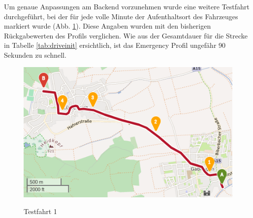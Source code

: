Um genaue Anpassungen am Backend vorzunehmen wurde eine weitere Testfahrt durchgeführt, bei der für jede volle Minute der Aufenthaltsort des Fahrzeuges markiert wurde (Abb. \ref{fig:drive1}).
Diese Angaben wurden mit den bisherigen Rückgabewerten des Profils verglichen.
Wie aus der Gesamtdauer für die Strecke in Tabelle \ref{tab:driveinit} ersichtlich, ist das Emergency Profil ungefähr 90 Sekunden zu schnell.

\begin{figure}[htb]
\centering
\includegraphics[width = 0.7 \textwidth]{../media/Fahrt1.png} \\
\caption{Testfahrt 1}
\label{fig:drive1}
\end{figure}

